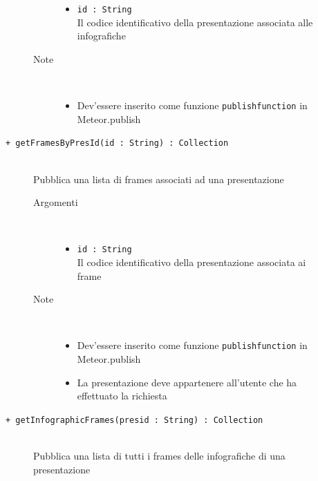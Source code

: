 \begin{description}
\begin{description}
\begin{description}
\begin{itemize}
					\item \texttt{id : String			} \hfill \\
					Il codice identificativo della presentazione associata alle infografiche
					
				\end{itemize}
			\item[Note] \hfill \\
			\begin{itemize}
					\item Dev'essere inserito come funzione \texttt{publishfunction} in Meteor.publish
				\end{itemize}
		\end{description}
	\end{description}
	
	\begin{description}
		\item[\texttt{+ getFramesByPresId(id : String) : Collection			}] \hfill \\
			Pubblica una lista di frames associati ad una presentazione
			
		\begin{description}
			\item[Argomenti] \hfill \\
				\begin{itemize}
				
					\item \texttt{id : String			} \hfill \\
					Il codice identificativo della presentazione associata ai frame
					
				\end{itemize}
			\item[Note] \hfill \\
			\begin{itemize}
					\item Dev'essere inserito come funzione \texttt{publishfunction} in Meteor.publish
					\item La presentazione deve appartenere all'utente che ha effettuato la richiesta
				\end{itemize}
		\end{description}
	\end{description}
	
	\begin{description}
		\item[\texttt{+ getInfographicFrames(presid : String) : Collection			}] \hfill \\
			Pubblica una lista di tutti i frames delle infografiche di una presentazione
			

\end{description}
\end{description}
